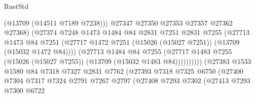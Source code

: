 \begin{lexlean}{RustStd}
\begin{coremodule}
                                        (@13709 (@14511 @7189 @7238)))
                                      @27347
                                      @27350
                                      @27353
                                      @27357
                                      @27362
                                      @27368)
                                    (@27374
                                      @7248
                                      @1473
                                      @1484
                                      @84
                                      @2831
                                      @7251
                                      @2831
                                      @7255
                                      (@27713
                                        @1473
                                        @84
                                        @7251
                                        (@27717
                                          @1472
                                          @7251
                                          (@15026 (@15027 @7251))
                                          (@13709 (@15032 @1472 @84))))
                                      (@27713
                                        @1484
                                        @84
                                        @7255
                                        (@27717
                                          @1483
                                          @7255
                                          (@15026 (@15027 @7255))
                                          (@13709 (@15032 @1483 @84))))))))))
                          (@27383
                            @1533
                            @1580
                            @84
                            @7318
                            @7327
                            @2831
                            @7762
                            (@27393
                              @7318
                              @7325
                              @6750
                              (@27400
                                @7304
                                @7317
                                @7324
                                @2791
                                @7267
                                @2797
                                (@27408
                                  @7293
                                  @7302
                                  (@27413
                                    @7293
                                    @7300
                                    @6722

\end{coremodule}
\end{lexlean}
